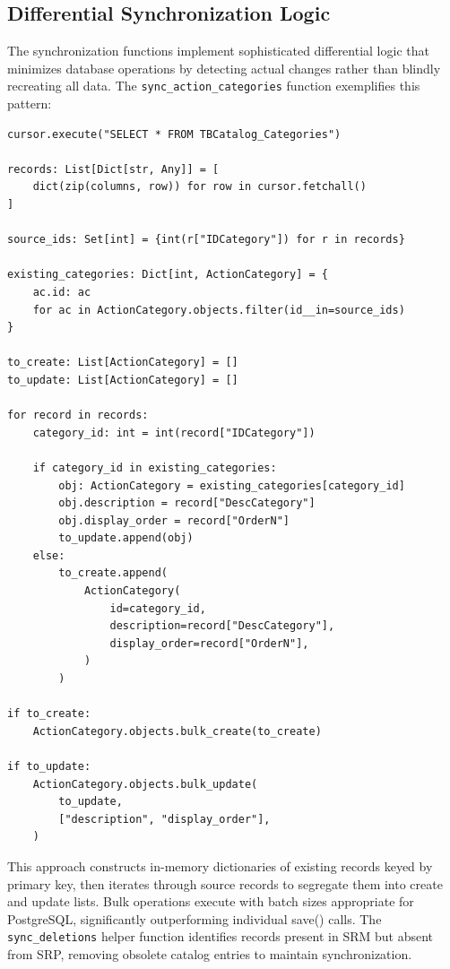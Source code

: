 \subsection{Differential Synchronization Logic}

The synchronization functions implement sophisticated differential logic that minimizes database operations by detecting actual changes rather than blindly recreating all data. The \texttt{sync\_action\_categories} function exemplifies this pattern:

\begin{verbatim}
cursor.execute("SELECT * FROM TBCatalog_Categories")

records: List[Dict[str, Any]] = [
    dict(zip(columns, row)) for row in cursor.fetchall()
]

source_ids: Set[int] = {int(r["IDCategory"]) for r in records}

existing_categories: Dict[int, ActionCategory] = {
    ac.id: ac
    for ac in ActionCategory.objects.filter(id__in=source_ids)
}

to_create: List[ActionCategory] = []
to_update: List[ActionCategory] = []

for record in records:
    category_id: int = int(record["IDCategory"])

    if category_id in existing_categories:
        obj: ActionCategory = existing_categories[category_id]
        obj.description = record["DescCategory"]
        obj.display_order = record["OrderN"]
        to_update.append(obj)
    else:
        to_create.append(
            ActionCategory(
                id=category_id,
                description=record["DescCategory"],
                display_order=record["OrderN"],
            )
        )

if to_create:
    ActionCategory.objects.bulk_create(to_create)

if to_update:
    ActionCategory.objects.bulk_update(
        to_update,
        ["description", "display_order"],
    )
\end{verbatim}

This approach constructs in-memory dictionaries of existing records keyed by primary key, then iterates through source records to segregate them into create and update lists. Bulk operations execute with batch sizes appropriate for PostgreSQL, significantly outperforming individual save() calls. The \texttt{sync\_deletions} helper function identifies records present in SRM but absent from SRP, removing obsolete catalog entries to maintain synchronization.

